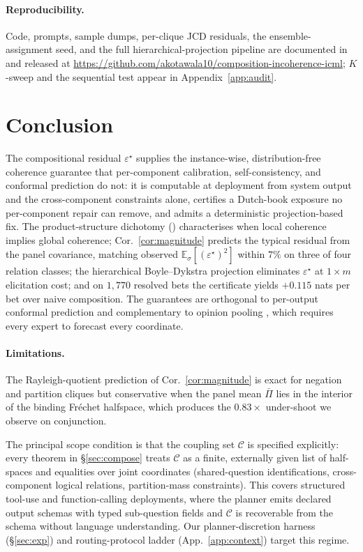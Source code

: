 \documentclass{article}
\theoremstyle{plain}
\theoremstyle{definition}
\theoremstyle{remark}
\newcommand{\Cset}{\mathcal{C}}
\newcommand{\E}{\mathbb{E}}
\newcommand{\eps}{\varepsilon}
\begin{document}
\paragraph{Reproducibility.}
Code, prompts, sample dumps, per-clique JCD residuals, the
ensemble-assignment seed, and the full hierarchical-projection
pipeline are documented in  and released at
\url{https://github.com/akotawala10/composition-incoherence-icml};
$K$-sweep and the sequential test appear in
Appendix~\ref{app:audit}.

\section{Conclusion}
\label{sec:conclusion}

The compositional residual $\eps^\star$ supplies the instance-wise,
distribution-free coherence guarantee that per-component calibration,
self-consistency, and conformal prediction do not: it is computable
at deployment from system output and the cross-component constraints
alone, certifies a Dutch-book exposure no per-component repair can
remove, and admits a deterministic projection-based fix. The
product-structure dichotomy () characterises when
local coherence implies global coherence; Cor.~\ref{cor:magnitude}
predicts the typical residual from the panel covariance, matching
observed $\E_\sigma[(\eps^\star)^2]$ within $7\%$ on three of
four relation classes; the hierarchical Boyle--Dykstra projection
eliminates $\eps^\star$ at $1\!\times\!m$ elicitation cost; and on
$1{,}770$ resolved bets the certificate yields $+0.115$ nats per bet
over naive composition. The guarantees are orthogonal to
per-output conformal prediction \citep{angelopoulos2021gentle} and
complementary to opinion pooling
\citep{genest1986combining,abbas2009log}, which requires every
expert to forecast every coordinate.

\paragraph{Limitations.}
The Rayleigh-quotient prediction of Cor.~\ref{cor:magnitude} is
exact for negation and partition cliques but conservative when the
panel mean $\bar\Pi$ lies in the interior of the binding Fr\'echet
halfspace, which produces the $0.83\!\times$ under-shoot we observe
on conjunction.

The principal scope condition is that the coupling set $\Cset$ is
specified explicitly: every theorem in \S\ref{sec:compose} treats
$\Cset$ as a finite, externally given list of half-spaces and
equalities over joint coordinates (shared-question identifications,
cross-component logical relations, partition-mass constraints).
This covers structured tool-use and function-calling deployments,
where the planner emits declared output schemas with typed
sub-question fields and $\Cset$ is recoverable from the schema
without language understanding. Our planner-discretion harness
(\S\ref{sec:exp}) and routing-protocol ladder
(App.~\ref{app:context}) target this regime.
\end{document}
